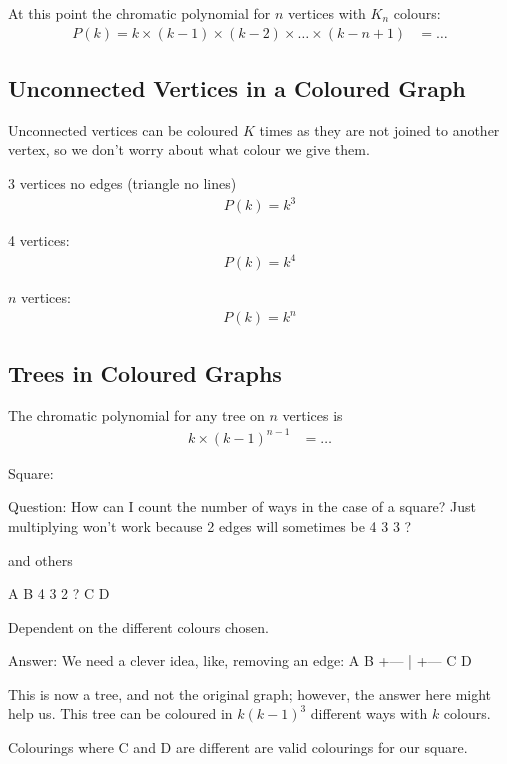 At this point the chromatic polynomial for $n$ vertices with $K_n$ colours:
\begin{align}
  P(k) = k \times (k-1) \times (k-2) \times \ldots \times (k-n+1) & = \ldots
\end{align}

\subsection{Unconnected Vertices in a Coloured Graph}
\label{sec:UnconnectedVerticesInAColouredGraph}
Unconnected vertices can be coloured $K$ times as they are not joined to another
vertex, so we don't worry about what colour we give them.

3 vertices no edges (triangle no lines)
\begin{align}
  P(k) = k^{3}
\end{align}

4 vertices:
\begin{align}
  P(k) = k^{4}
\end{align}

$n$ vertices:
\begin{align}
  P(k) = k^{n}
\end{align}

\subsection{Trees in Coloured Graphs}
\label{sec:TreesInColouredGraphs}
The chromatic polynomial for any tree on $n$ vertices is
\begin{align}
  k \times (k-1)^{n-1} & = \ldots
\end{align}

Square:

Question: How can I count the number of ways in the case of a square? Just multiplying
won't work because 2 edges will sometimes be
4 3
3 ?

and others

A  B
4  3
2  ?
C  D

Dependent on the different colours chosen.

Answer: We need a clever idea, like, removing an edge:
A  B
+---
|
+---
C  D

This is now a tree, and not the original graph; however, the answer here might help us.
This tree can be coloured in $k(k-1)^{3}$ different ways with $k$ colours.

Colourings where C and D are different are valid colourings for our square. 

